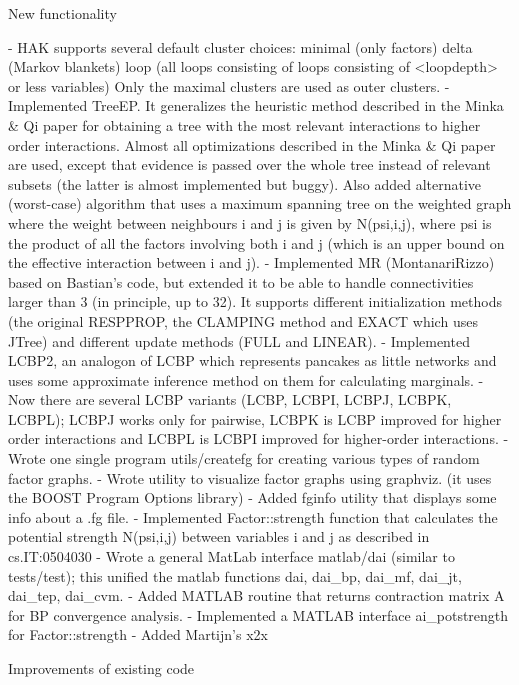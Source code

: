 \begin{DoxyVerbInclude}
New functionality

- HAK supports several default cluster choices:
  minimal (only factors)
  delta   (Markov blankets)
  loop    (all loops consisting of loops consisting of <loopdepth> or less variables)
  Only the maximal clusters are used as outer clusters.
- Implemented TreeEP. It generalizes the heuristic method described in the
  Minka & Qi paper for obtaining a tree with the most relevant interactions to
  higher order interactions. Almost all optimizations described in the Minka & Qi
  paper are used, except that evidence is passed over the whole tree instead of
  relevant subsets (the latter is almost implemented but buggy). Also added
  alternative (worst-case) algorithm that uses a maximum spanning tree on the
  weighted graph where the weight between neighbours i and j is given by
  N(psi,i,j), where psi is the product of all the factors involving both i and j
  (which is an upper bound on the effective interaction between i and j).
- Implemented MR (MontanariRizzo) based on Bastian's code, but extended it
  to be able to handle connectivities larger than 3 (in principle, up to 32).
  It supports different initialization methods (the original RESPPROP,
  the CLAMPING method and EXACT which uses JTree) and different update methods
  (FULL and LINEAR).
- Implemented LCBP2, an analogon of LCBP which represents pancakes as little
  networks and uses some approximate inference method on them for calculating
  marginals.
- Now there are several LCBP variants (LCBP, LCBPI, LCBPJ, LCBPK, LCBPL);
  LCBPJ works only for pairwise, LCBPK is LCBP improved for higher order
  interactions and LCBPL is LCBPI improved for higher-order interactions.
- Wrote one single program utils/createfg for creating various types of
  random factor graphs.
- Wrote utility to visualize factor graphs using graphviz.
  (it uses the BOOST Program Options library)
- Added fginfo utility that displays some info about a .fg file.
- Implemented Factor::strength function that calculates the potential strength
  N(psi,i,j) between variables i and j as described in cs.IT:0504030
- Wrote a general MatLab interface matlab/dai (similar to tests/test);
  this unified the matlab functions dai, dai_bp, dai_mf, dai_jt, dai_tep, dai_cvm.
- Added MATLAB routine that returns contraction matrix A for BP convergence analysis.
- Implemented a MATLAB interface ai_potstrength for Factor::strength
- Added Martijn's x2x

Improvements of existing code


\end{DoxyVerbInclude}
